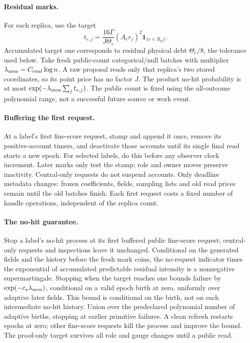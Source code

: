 \documentclass[11pt]{article}
\theoremstyle{remark}
\begin{document}
\paragraph{Residual marks.}
For each replica, use the target
\[
 t_{e,j}=\frac{16\Gamma}{J\Theta_e}
             (A_er_j)^2\mathbf1_{\{e\in R_E\}} .
\]
Accumulated target one corresponds to residual physical debt $\Theta_e/8$, the
tolerance used below.
Take fresh public-count categorical/null batches with multiplier $\lambda_{\rm
mon}=C_{\rm conf}\log n$.
A raw proposal reads only that replica's two stored coordinates, so its point
price has no factor $J$.
The product no-hit probability is at most $\exp(-\lambda_{\rm
mon}\sum_jt_{e,j})$.
The public count is fixed using the all-outcome polynomial range, not a
successful future source or work event.

\paragraph{Buffering the first request.}
At a label's first fine-score request, stamp and append it once, remove its
positive-account timers, and deactivate those accounts until its single final
read starts a new epoch.
For selected labels, do this before any observer clock increment.
Later marks only test the stamp; role and owner moves preserve inactivity.
Central-only requests do not suspend accounts.
Only deadline metadata changes: frozen coefficients, fields, sampling lists and
old read prices remain until the old batches finish.
Each first request costs a fixed number of handle operations, independent of the
replica count.

\paragraph{The no-hit guarantee.}
Stop a label's no-hit process at its first buffered public fine-score request;
central-only requests and inspections leave it unchanged.
Conditional on the generated fields and the history before the fresh mark coins,
the no-request indicator times the exponential of accumulated predictable
residual intensity is a nonnegative supermartingale.
Stopping when the target reaches one bounds failure by $\exp(-c_\star\lambda_{\rm
mon})$, conditional on a valid epoch birth at zero, uniformly over adaptive
later fields.
This bound is conditional on the birth, not on each intermediate no-hit history.
Union over the predeclared polynomial number of adaptive births, stopping at
earlier primitive failures.
A clean refresh restarts epochs at zero; other fine-score requests kill the
process and improve the bound.
The proof-only target survives all role and gauge changes until a public read.
\end{document}
